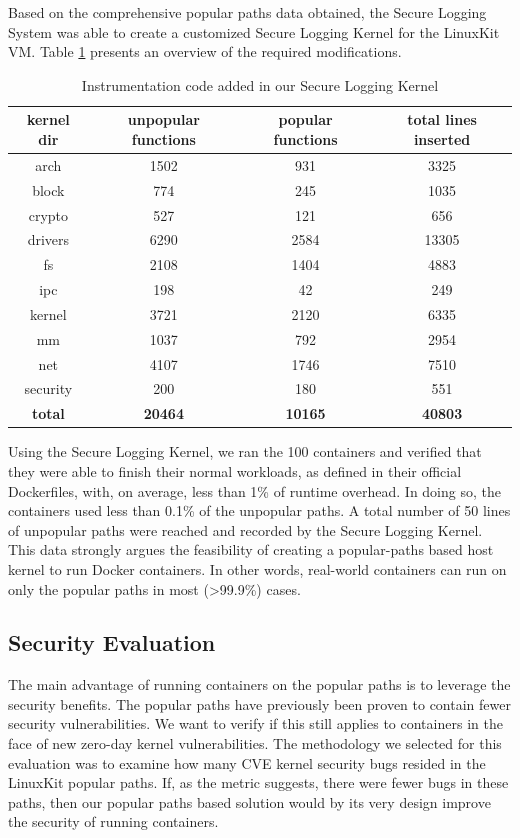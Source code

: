 Based on the comprehensive popular paths data obtained, the Secure Logging System was able to create a customized Secure Logging Kernel for the LinuxKit VM. 
Table \ref{tab:kernel_instrumentation} presents an overview of the required modifications. 

\begin{table}[h!]
\begin{center}
\caption{Instrumentation code added in our Secure Logging Kernel}
\label{tab:kernel_instrumentation}
\begin{tabular}{c|c|c|c}
 kernel dir & unpopular functions & popular functions & total lines inserted \\
 \hline
 arch & 1502 & 931 & 3325 \\
 \hline
 block & 774 & 245 & 1035 \\
 \hline
 crypto & 527 & 121 & 656 \\ 
 \hline
 drivers & 6290 & 2584 & 13305 \\
 \hline
 fs & 2108 & 1404 & 4883 \\
 \hline
 ipc & 198 & 42 & 249 \\
 \hline
 kernel & 3721 & 2120 & 6335 \\
 \hline
 mm & 1037 & 792 & 2954 \\
 \hline
 net & 4107 & 1746 & 7510 \\
 \hline
 security & 200 & 180 & 551 \\
 \hline
 \textbf{total} & \textbf{20464} & \textbf{10165} & \textbf{40803} \\
\end{tabular}
\end{center}
\end{table}

Using  the Secure Logging Kernel, we ran the 100 containers and verified that they were able to finish their normal workloads, 
as defined in their official Dockerfiles, with, on average, less than 1\% of runtime overhead. 
In doing so, the containers used less than 0.1\% of the unpopular paths. 
A total number of 50 lines of unpopular paths were reached and recorded by the Secure Logging Kernel. 
This data strongly argues the feasibility of creating a popular-paths based host kernel to run Docker containers. 
In other words, real-world containers can run on only the popular paths in most (>99.9\%) cases. 

\subsection{Security Evaluation}
\label{sec.evaluation.security} 
The main advantage of running containers on the popular paths is to leverage the security benefits. 
The popular paths have previously been proven to contain fewer security vulnerabilities. 
We want to verify if this still applies to containers in the face of new zero-day kernel vulnerabilities. 
The methodology we selected for this evaluation was to examine how many CVE kernel security bugs resided in the LinuxKit popular paths. 
If, as the metric suggests, there were fewer bugs in these paths, then our popular paths based solution would by its very design improve the security of running containers.

